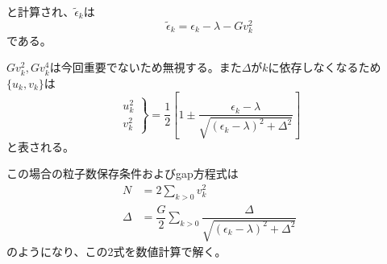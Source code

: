 \documentclass[a4paper]{jsreport}
\begin{document}
  と計算され、\(\tilde{\epsilon}_k\)は
  \begin{equation}
      \tilde{\epsilon}_k=\epsilon_k -\lambda - Gv_k^2
  \end{equation}
  である。\par
  \(Gv_k^2, Gv_k^4\)は今回重要でないため無視する。また\(\Delta\)が\(k\)に依存しなくなるため\(\{u_k,v_k\}\)は
  \begin{equation}
      \left.\begin{aligned}
        u_k^2\\
        v_k^2
      \end{aligned}\right\}=
      \frac{1}{2}\left[
        1\pm\frac{\epsilon_k - \lambda}{\sqrt{(\epsilon_k-\lambda)^2+\Delta^2}}
      \right]
  \end{equation}
  と表される。\par
  この場合の粒子数保存条件およびgap方程式は
  \begin{align}
      N       &=  2\sum_{k>0}v_k^2 \label{number1}\\
      \Delta  &=  \dfrac{G}{2}\sum_{k>0}\dfrac{\Delta}{\sqrt{(\epsilon_k-\lambda)^2+\Delta^2}}\label{Delta2}
  \end{align}
  のようになり、この2式を数値計算で解く。

\end{document}
